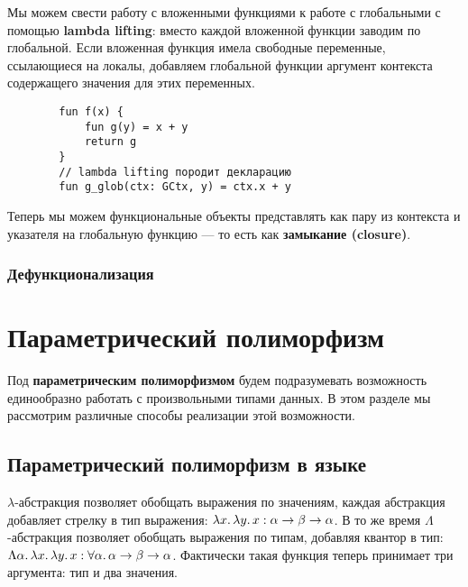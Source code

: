\documentclass[12pt]{article}
\newcommand{\vocab}[1]{\textbf{#1}} %
\begin{document}
    Мы можем свести работу с вложенными функциями к работе с глобальными с помощью \vocab{lambda lifting}: вместо каждой вложенной функции заводим по глобальной.
    Если вложенная функция имела свободные переменные, ссылающиеся на локалы, добавляем глобальной функции аргумент контекста содержащего значения для этих переменных.
    \begin{verbatim}
        fun f(x) {
            fun g(y) = x + y
            return g
        }
        // lambda lifting породит декларацию
        fun g_glob(ctx: GCtx, y) = ctx.x + y
    \end{verbatim}

    Теперь мы можем функциональные объекты представлять как пару из контекста и указателя на глобальную функцию --- то есть как \vocab{замыкание (closure)}.

    \cite{reynolds1998definitional}
    \cite{defunctionalization-slides}

    \subsubsection{Дефункционализация} \label{subsubsec:defunctionalization}








    \cite{reynolds1998definitional}
    \cite{defunctionalization-slides}



    \section{Параметрический полиморфизм}

    Под \vocab{параметрическим полиморфизмом} будем подразумевать возможность единообразно работать с произвольными типами данных.
    В этом разделе мы рассмотрим различные способы реализации этой возможности.

    \subsection{Параметрический полиморфизм в языке}

    $\lambda$-абстракция позволяет обобщать выражения по значениям, каждая абстракция добавляет стрелку в тип выражения: $\lambda x\ldotp \lambda y\ldotp x : \alpha\to\beta\to\alpha$.
    В то же время $\Lambda$-абстракция позволяет обобщать выражения по типам, добавляя квантор в тип: $\Lambda \alpha\ldotp\lambda x\ldotp \lambda y\ldotp x : \forall \alpha\ldotp \alpha\to\beta\to\alpha$.
    Фактически такая функция теперь принимает три аргумента: тип и два значения.
\end{document}
